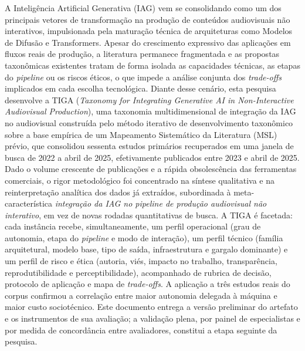 \begin{resumo}
    A Inteligência Artificial Generativa (IAG) vem se consolidando como um dos principais vetores de transformação na produção de conteúdos audiovisuais não interativos, impulsionada pela maturação técnica de arquiteturas como Modelos de Difusão e Transformers. Apesar do crescimento expressivo das aplicações em fluxos reais de produção, a literatura permanece fragmentada e as propostas taxonômicas existentes tratam de forma isolada as capacidades técnicas, as etapas do \textit{pipeline} ou os riscos éticos, o que impede a análise conjunta dos \textit{trade-offs} implicados em cada escolha tecnológica. Diante desse cenário, esta pesquisa desenvolve a TIGA (\textit{Taxonomy for Integrating Generative AI in Non-Interactive Audiovisual Production}), uma taxonomia multidimensional de integração da IAG no audiovisual construída pelo método iterativo de desenvolvimento taxonômico sobre a base empírica de um Mapeamento Sistemático da Literatura (MSL) prévio, que consolidou sessenta estudos primários recuperados em uma janela de busca de 2022 a abril de 2025, efetivamente publicados entre 2023 e abril de 2025. Dado o volume crescente de publicações e a rápida obsolescência das ferramentas comerciais, o rigor metodológico foi concentrado na síntese qualitativa e na reinterpretação analítica dos dados já extraídos, subordinada à meta-característica \textit{integração da IAG no pipeline de produção audiovisual não interativo}, em vez de novas rodadas quantitativas de busca. A TIGA é facetada: cada instância recebe, simultaneamente, um perfil operacional (grau de autonomia, etapa do \textit{pipeline} e modo de interação), um perfil técnico (família arquitetural, modelo base, tipo de saída, infraestrutura e gargalo dominante) e um perfil de risco e ética (autoria, viés, impacto no trabalho, transparência, reprodutibilidade e perceptibilidade), acompanhado de rubrica de decisão, protocolo de aplicação e mapa de \textit{trade-offs}. A aplicação a três estudos reais do corpus confirmou a correlação entre maior autonomia delegada à máquina e maior custo sociotécnico. Este documento entrega a versão preliminar do artefato e os instrumentos de sua avaliação; a validação plena, por painel de especialistas e por medida de concordância entre avaliadores, constitui a etapa seguinte da pesquisa.
    
    
    \end{resumo}
    